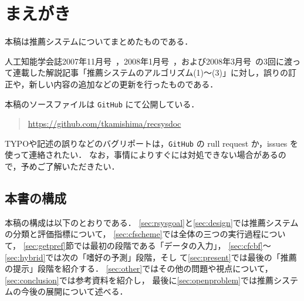
\chapter*{まえがき}
\label{sec:preface}

本稿は推薦システムについてまとめたものである．

人工知能学会誌2007年11月号~\cite{jpublist:076}，2008年1月号~\cite{jpublist:081}，および2008年3月号~\cite{jpublist:083}の3回に渡って連載した解説記事「推薦システムのアルゴリズム(1)〜(3)」に対し，誤りの訂正や，新しい内容の追加などの更新を行ったものである．

本稿のソースファイルは \texttt{GitHub} にて公開している．
\begin{quote}
\url{https://github.com/tkamishima/recsysdoc}
\end{quote}
TYPOや記述の誤りなどのバグリポートは，\texttt{GitHub} の rull request か，issues を使って連絡されたい．
なお，事情によりすぐには対処できない場合があるので，予めご了解いただきたい．

\section*{本書の構成}
\label{sec:preface-organization}

本稿の構成は以下のとおりである．
\ref{sec:rsysgoal}と\ref{sec:design}では推薦システムの分類と評価指標について，
\ref{sec:cfscheme}では全体の三つの実行過程について，
\ref{sec:getpref}節では最初の段階である「データの入力」，
\ref{sec:cfcbf}〜\ref{sec:hybrid}では次の「嗜好の予測」段階，そし
て\ref{sec:present}では最後の「推薦の提示」段階を紹介する．
\ref{sec:other}ではその他の問題や視点について，
\ref{sec:conclusion}では参考資料を紹介し，
最後に\ref{sec:openproblem}では推薦システムの今後の展開について述べる．
